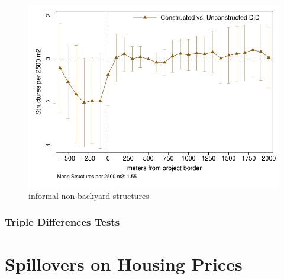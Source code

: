 \documentclass[aspectratio=32]{beamer}
\begin{document}
\begin{frame}
{\begin{center}
 \begin{figure}[ht]
   \includegraphics[scale=0.65,trim={5cm 1cm 5cm 0cm}]{figures/bblu/distplotDDD_bblu_inf_non_backyard_admin}
   \caption{informal non-backyard structures}
 \end{figure}
 \end{center}
}

\end{frame}


\begin{frame}
\frametitle{Triple Differences Tests}
\vspace{-1.5mm}
\begin{table}

\end{table}
\end{frame}


\section{Spillovers on Housing Prices}

\end{document}
